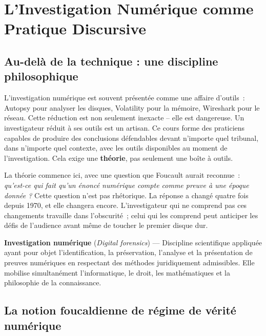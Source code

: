 \bigskip

\section{L'Investigation Numérique comme Pratique Discursive}

\subsection{Au-delà de la technique : une discipline philosophique}

L'investigation numérique est souvent présentée comme une affaire d'outils~:
Autopsy pour analyser les disques, Volatility pour la mémoire, Wireshark pour
le réseau. Cette réduction est non seulement inexacte -- elle est dangereuse.
Un investigateur réduit à ses outils est un artisan. Ce cours forme des
praticiens capables de produire des conclusions défendables devant n'importe
quel tribunal, dans n'importe quel contexte, avec les outils disponibles au
moment de l'investigation. Cela exige une \textbf{théorie}, pas seulement
une boîte à outils.

\medskip

La théorie commence ici, avec une question que Foucault aurait reconnue~:
\textit{qu'est-ce qui fait qu'un énoncé numérique compte comme preuve à
une époque donnée ?} Cette question n'est pas rhétorique. La réponse a changé
quatre fois depuis 1970, et elle changera encore. L'investigateur qui ne
comprend pas ces changements travaille dans l'obscurité~; celui qui les
comprend peut anticiper les défis de l'audience avant même de toucher
le premier disque dur.

\begin{boxdef}
\textbf{Investigation numérique} (\textit{Digital forensics}) ---
Discipline scientifique appliquée ayant pour objet l'identification,
la préservation, l'analyse et la présentation de preuves numériques en
respectant des méthodes juridiquement admissibles. Elle mobilise
simultanément l'informatique, le droit, les mathématiques et la philosophie
de la connaissance.
\end{boxdef}

\subsection{La notion foucaldienne de régime de vérité numérique}

